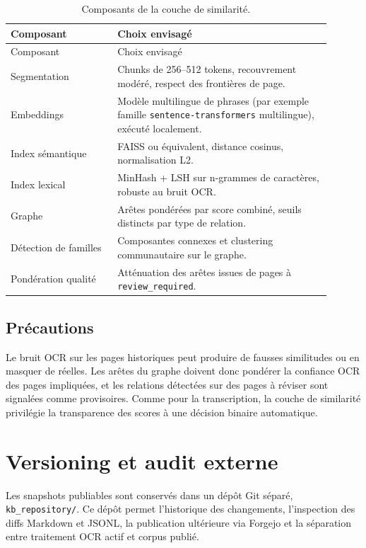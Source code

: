 \documentclass[11pt,a4paper]{article}
\begin{document}
\begin{longtable}{p{0.30\linewidth}p{0.60\linewidth}}
\caption{Composants de la couche de similarité.}\label{tab:simtech}\\
\toprule
Composant & Choix envisagé \\
\midrule
\endfirsthead
\toprule
Composant & Choix envisagé \\
\midrule
\endhead
Segmentation & Chunks de 256--512 tokens, recouvrement modéré, respect des frontières de page. \\
Embeddings & Modèle multilingue de phrases (par exemple famille \texttt{sentence-transformers} multilingue), exécuté localement. \\
Index sémantique & FAISS ou équivalent, distance cosinus, normalisation L2. \\
Index lexical & MinHash + LSH sur n-grammes de caractères, robuste au bruit OCR. \\
Graphe & Arêtes pondérées par score combiné, seuils distincts par type de relation. \\
Détection de familles & Composantes connexes et clustering communautaire sur le graphe. \\
Pondération qualité & Atténuation des arêtes issues de pages à \texttt{review\_required}. \\
\bottomrule
\end{longtable}

\subsection{Précautions}

Le bruit OCR sur les pages historiques peut produire de fausses similitudes ou en masquer de réelles. Les arêtes du graphe doivent donc pondérer la confiance OCR des pages impliquées, et les relations détectées sur des pages à réviser sont signalées comme provisoires. Comme pour la transcription, la couche de similarité privilégie la transparence des scores à une décision binaire automatique.

\section{Versioning et audit externe}

Les snapshots publiables sont conservés dans un dépôt Git séparé, \texttt{kb\_repository/}. Ce dépôt permet l'historique des changements, l'inspection des diffs Markdown et JSONL, la publication ultérieure via Forgejo et la séparation entre traitement OCR actif et corpus publié.
\end{document}
